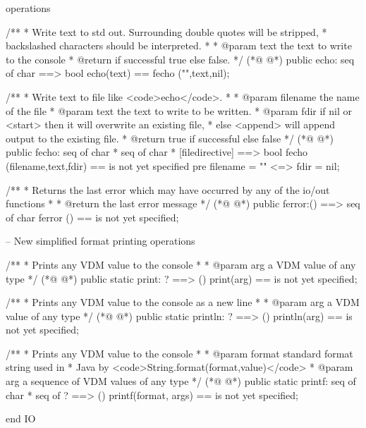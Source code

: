 \begin{vdmpp}[breaklines=true]
operations

/**
 * Write text to std out. Surrounding double quotes will be stripped,
 * backslashed characters should be interpreted.
 *
 * @param text the text to write to the console
 * @return if successful true else false.
 */
(*@
\label{echo:78}
@*)
public echo: seq of char ==> bool
echo(text) ==
  fecho ("",text,nil);

/**
 * Write text to file like <code>echo</code>.
 *
 * @param filename the name of the file
 * @param text the text to write to be written.
 * @param fdir if nil or <start> then it will overwrite an existing file, 
 *  else <append> will append output to the existing file.
 * @return true if successful else false
 */
(*@
\label{fecho:91}
@*)
public fecho: seq of char * seq of char * [filedirective] ==> bool
fecho (filename,text,fdir) ==
  is not yet specified
  pre filename = "" <=> fdir = nil;

/**
 * Returns the last error which may have occurred by any of the io/out functions
 *
 * @return the last error message
 */
(*@
\label{ferror:101}
@*)
public ferror:()  ==> seq of char
ferror () ==
  is not yet specified;
  
-- New simplified format printing operations


/**
 * Prints any VDM value to the console
 *
 * @param arg a VDM value of any type
 */
(*@
\label{print:113}
@*)
public static print: ? ==> ()
print(arg) ==
    is not yet specified;

/**
 * Prints any VDM value to the console as a new line
 *
 * @param arg a VDM value of any type
 */
(*@
\label{println:122}
@*)
public static println: ? ==> ()
println(arg) ==
    is not yet specified;

/**
 * Prints any VDM value to the console
 *
 * @param format standard format string used in 
  *  Java by <code>String.format(format,value)</code>
 * @param arg a sequence of VDM values of any type
 */
(*@
\label{printf:133}
@*)
public static printf: seq of char * seq of ? ==> ()
printf(format, args) ==
    is not yet specified;

end IO
\end{vdmpp}
